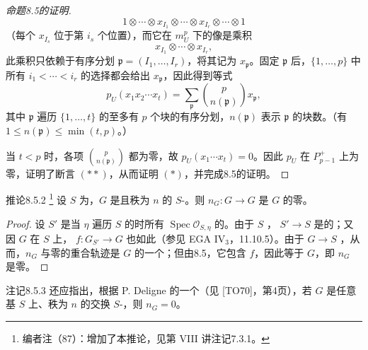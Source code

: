 \begin{proof}[命题8.5的证明]
\[
 1\otimes\cdots\otimes x_{I_1}\otimes\cdots\otimes x_{I_r}\otimes\cdots\otimes1
\]
（每个 $x_{I_s}$ 位于第 $i_s$ 个位置），而它在 $m_U^p$ 下的像是乘积
\[
 x_{I_1}\otimes\cdots\otimes x_{I_r},
\]
此乘积只依赖于有序分划 $\mathfrak p=(I_1,\ldots,I_r)$，将其记为 $x_{\mathfrak p}$。固定 $\mathfrak p$ 后，$\{1,\ldots,p\}$ 中所有 $i_1<\cdots<i_r$ 的选择都会给出 $x_{\mathfrak p}$，因此得到等式
\[
 p_U(x_1x_2\cdots x_t)=\sum_{\mathfrak p}\binom{p}{n(\mathfrak p)}x_{\mathfrak p},
\]
其中 $\mathfrak p$ 遍历 $\{1,\ldots,t\}$ 的至多有 $p$ 个块的有序分划，$n(\mathfrak p)$ 表示 $\mathfrak p$ 的块数。（有 $1\le n(\mathfrak p)\le\min(t,p)$。）

当 $t<p$ 时，各项 $\binom p{n(\mathfrak p)}$ 都为零，故 $p_U(x_1\cdots x_t)=0$。因此 $p_U$ 在 $P_{p-1}^+$ 上为零，证明了断言 $(**)$，从而证明 $(*)$，并完成8.5的证明。
\end{proof}

\begin{SGAresult}{推论}{8.5.2}
\footnote{编者注（87）：增加了本推论，见第 VIII 讲注记7.3.1。}
设 $S$ 为，$G$ 是且秩为 $n$ 的 $S$-。则 $n_G:G\to G$ 是 $G$ 的零。
\end{SGAresult}
\begin{proof}
设 $S'$ 是当 $\eta$ 遍历 $S$ 的时所有 $\operatorname{Spec}\mathcal O_{S,\eta}$ 的。由于 $S$ ， $S'\to S$ 是的；又因 $G$ 在 $S$ 上， $f:G_{S'}\to G$ 也如此（参见 EGA IV$_3$，11.10.5）。由于 $G\to S$ ，从而，$n_G$ 与零的重合轨迹是 $G$ 的一个；但由8.5，它包含 $f$，因此等于 $G$，即 $n_G$ 是零。
\end{proof}

\begin{SGAresult}{注记}{8.5.3}
还应指出，根据 P. Deligne 的一个（见 [TO70]，第4页），若 $G$ 是任意基 $S$ 上、秩为 $n$ 的交换 $S$-，则 $n_G=0$。
\end{SGAresult}


